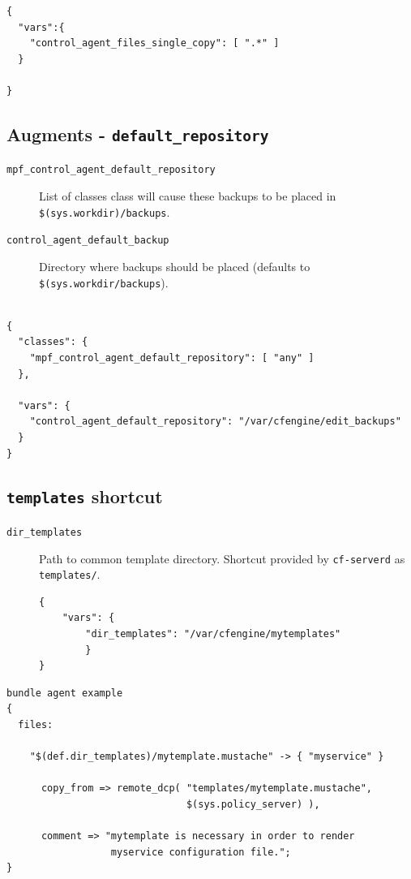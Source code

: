 \documentclass[11pt]{article}
\begin{document}
\begin{verbatim}
{
  "vars":{
    "control_agent_files_single_copy": [ ".*" ]
  }

}
\end{verbatim}

\subsection*{Augments - \texttt{default\_repository}}
\label{sec:org389b43b}

\begin{description}
\item[{\texttt{mpf\_control\_agent\_default\_repository}}] List of classes class will cause
these backups to be placed in \texttt{\$(sys.workdir)/backups}.

\item[{\texttt{control\_agent\_default\_backup}}] Directory where backups should be placed
(defaults to \texttt{\$(sys.workdir/backups}).
\end{description}

\begin{verbatim}

{
  "classes": {
    "mpf_control_agent_default_repository": [ "any" ]
  },

  "vars": {
    "control_agent_default_repository": "/var/cfengine/edit_backups"
  }
}
\end{verbatim}

\subsection*{\texttt{templates} shortcut}
\label{sec:orgac221a0}

\begin{description}
\item[{\texttt{dir\_templates}}] Path to common template directory. Shortcut provided by
\texttt{cf-serverd} as \texttt{templates/}.

\begin{verbatim}
{
    "vars": {
        "dir_templates": "/var/cfengine/mytemplates"
        }
}
\end{verbatim}
\end{description}

\begin{verbatim}
bundle agent example
{
  files:

    "$(def.dir_templates)/mytemplate.mustache" -> { "myservice" }

      copy_from => remote_dcp( "templates/mytemplate.mustache",
                               $(sys.policy_server) ),

      comment => "mytemplate is necessary in order to render
                  myservice configuration file.";
}
\end{verbatim}
\end{document}
